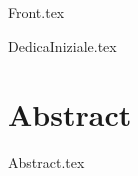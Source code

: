 \documentclass[12pt,onesidet]{report}
\begin{document}
	
	\begin{titlepage}
		{Front.tex}
	\end{titlepage}

	{DedicaIniziale.tex}
    
    
    \chapter*{Abstract}
    {Abstract.tex}
    
    \tableofcontents{}
    \newpage
    
    
     
    
    
\end{document}
